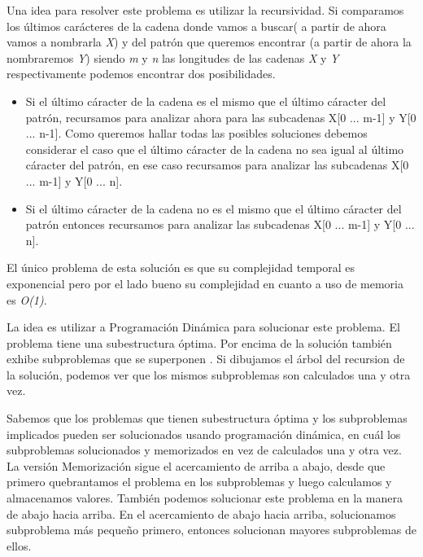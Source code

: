 Una idea para resolver este problema es utilizar la recursividad. Si comparamos los últimos carácteres de la cadena donde vamos a buscar( a partir de ahora vamos a nombrarla {\em X}) y del patrón que queremos encontrar (a partir de ahora la nombraremos {\em Y}) siendo {\em m} y {\em n} las longitudes de las cadenas {\em X} y {\em Y} respectivamente podemos encontrar dos posibilidades.

\begin{itemize}
	\item Si el último cáracter de la cadena es el mismo que el último cáracter del patrón, recursamos para analizar ahora para las subcadenas X[0 ... m-1] y Y[0 ... n-1]. Como queremos hallar todas las posibles soluciones debemos considerar el caso que el último cáracter de la cadena no sea igual al último cáracter del patrón, en ese caso recursamos para analizar las subcadenas  X[0 ... m-1] y Y[0 ... n]. 
	\item Si el último cáracter de la cadena no es el mismo que el último cáracter del patrón entonces recursamos para analizar las subcadenas  X[0 ... m-1] y Y[0 ... n]. 
\end{itemize}

El único problema de esta solución es que su complejidad temporal es exponencial pero por el lado bueno su complejidad en cuanto a uso de memoria es {\em O(1)}.

La idea es utilizar a Programación Dinámica para solucionar este problema. El problema tiene una subestructura óptima. Por encima de la solución también exhibe subproblemas que se superponen . Si dibujamos el árbol del recursion de la solución, podemos ver que los mismos subproblemas son calculados una y otra vez.

Sabemos que los problemas que tienen subestructura óptima  y los subproblemas implicados pueden ser solucionados usando programación dinámica, en cuál los subproblemas solucionados y memorizados  en vez de calculados una y otra vez. La versión Memorización sigue el acercamiento de arriba a abajo, desde que primero quebrantamos el problema en los subproblemas y luego calculamos y almacenamos valores. También podemos solucionar este problema en la manera de abajo hacia arriba. En el acercamiento de abajo hacia arriba, solucionamos subproblema más pequeño primero, entonces solucionan mayores subproblemas de ellos.